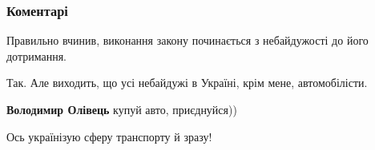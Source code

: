  
 
 
 
 
\subsubsection{Коментарі}
\label{sec:27_07_2021.fb.olivec_vladimir.1.marshrutka_mova.cmt}

\begin{itemize}
 
Правильно вчинив, виконання закону починається з небайдужості до його дотримання.

\begin{itemize}
 
Так. Але виходить, що усі небайдужі в Україні, крім мене, автомобілісти.

 
\textbf{Володимир Олівець} купуй авто, приєднуйся))

 
Ось українізую сферу транспорту й зразу!
\end{itemize}

 

\end{itemize}
